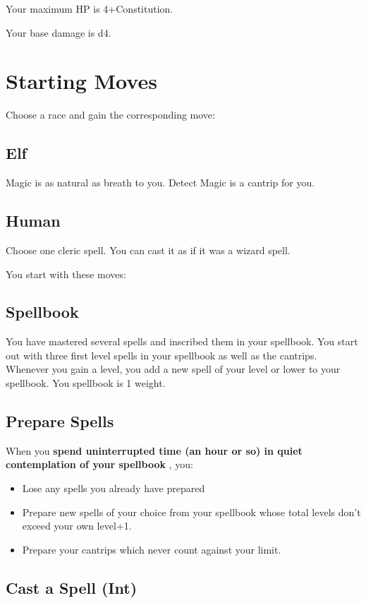  Your maximum HP is 4+Constitution.


 Your base damage is d4.
\section{Starting Moves}


 Choose a race and gain the corresponding move:
\subsection{Elf}


 Magic is as natural as breath to you. Detect Magic is a cantrip for you.
\subsection{Human}


 Choose one cleric spell. You can cast it as if it was a wizard spell.


 You start with these moves:
\subsection{Spellbook}


 You have mastered several spells and inscribed them in your spellbook. You start out with three first level spells in your spellbook as well as the cantrips. Whenever you gain a level, you add a new spell of your level or lower to your spellbook. You spellbook is 1 weight.
\subsection{Prepare Spells}


 When you \textbf{spend uninterrupted time (an hour or so) in quiet contemplation of your spellbook}
, you:
\begin{itemize}
\item Lose any spells you already have prepared
\item Prepare new spells of your choice from your spellbook whose total levels don't exceed your own level+1.
\item Prepare your cantrips which never count against your limit.

\end{itemize}
\subsection{Cast a Spell (Int)}


